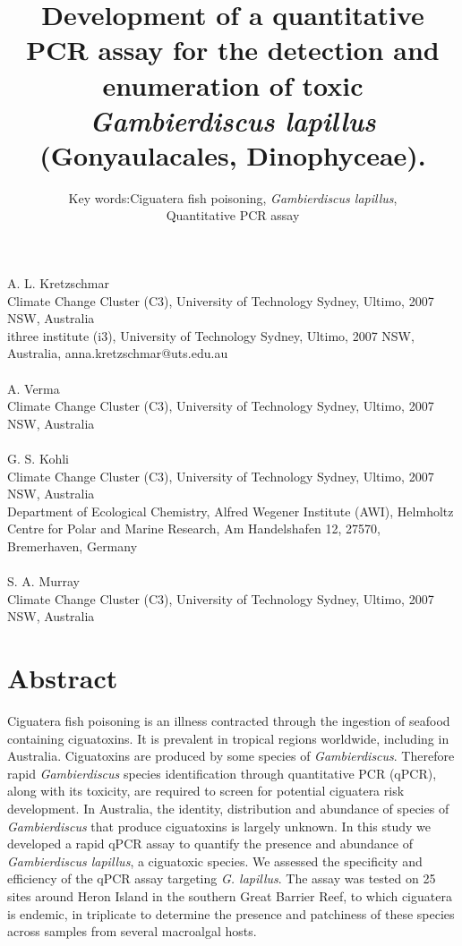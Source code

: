 \documentclass[12pt]{article}
\title{Development of a quantitative PCR assay for the detection and enumeration of toxic \emph{Gambierdiscus lapillus} (Gonyaulacales, Dinophyceae).} %
\author{Key words:Ciguatera fish poisoning, \emph{Gambierdiscus lapillus},\\
 Quantitative PCR assay}%
\date{}
\begin{document}
\maketitle
\paragraph{}A. L. Kretzschmar\\
Climate Change Cluster (C3), University of Technology Sydney, Ultimo, 2007 NSW, Australia\\
ithree institute (i3), University of Technology Sydney, Ultimo, 2007 NSW, Australia, anna.kretzschmar@uts.edu.au
\paragraph{}A. Verma \\
Climate Change Cluster (C3), University of Technology Sydney, Ultimo, 2007 NSW, Australia
\paragraph{}G. S. Kohli\\
Climate Change Cluster (C3), University of Technology Sydney, Ultimo, 2007 NSW, Australia\\
Department of Ecological Chemistry, Alfred Wegener Institute (AWI), Helmholtz Centre for Polar and Marine Research, Am Handelshafen 12, 27570, Bremerhaven, Germany
\paragraph{}S. A. Murray\\
Climate Change Cluster (C3), University of Technology Sydney, Ultimo, 2007 NSW, Australia
\newpage
\section*{Abstract}
Ciguatera fish poisoning is an illness contracted through the ingestion of seafood containing ciguatoxins. 
It is prevalent in tropical regions worldwide, including in Australia. 
Ciguatoxins are produced by some species of \emph{Gambierdiscus}. 
Therefore rapid \emph{Gambierdiscus} species identification through quantitative PCR (qPCR), along with its toxicity, are required to screen for potential ciguatera risk development. 
In Australia, the identity, distribution and abundance of species of \textit{Gambierdiscus} that produce ciguatoxins is largely unknown. 
In this study we developed a rapid qPCR assay to quantify the presence and abundance of \textit{Gambierdiscus lapillus}, a ciguatoxic species. %
We assessed the specificity and efficiency of the  qPCR assay targeting \textit{G. lapillus}. %
The assay was tested on 25 sites around Heron Island in the southern Great Barrier Reef, to which ciguatera is endemic, in triplicate to determine the presence and patchiness of these species across samples from several macroalgal hosts.  
\end{document}
